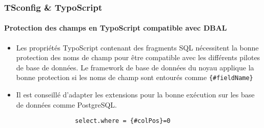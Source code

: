 
\begin{frame}[fragile]
	\frametitle{TSconfig \& TypoScript}
	\framesubtitle{Protection des champs en TypoScript compatible avec DBAL}

	\begin{itemize}
		\item Les propriétés TypoScript contenant des fragments SQL nécessitent la bonne protection
		 	des noms de champ pour être compatible avec les différents pilotes de base de données.
		 	Le framework de base de données du noyau applique la bonne protection si les noms de champ
		 	sont entourés comme \texttt{\{\#fieldName\}}

		\item Il est conseillé d'adapter les extensions pour la bonne exécution sur les base de données comme
		 	PostgreSQL.

			\begin{lstlisting}
				select.where = {#colPos}=0
			\end{lstlisting}


	\end{itemize}

\end{frame}

